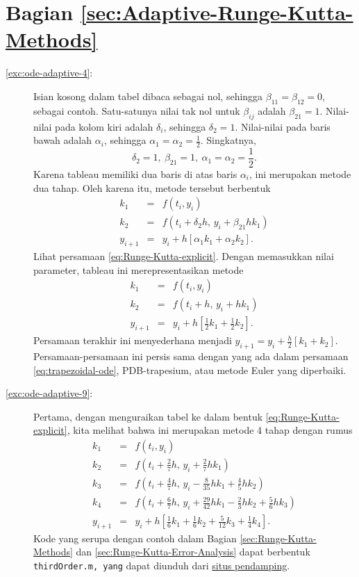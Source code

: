 \section*{Bagian \ref{sec:Adaptive-Runge-Kutta-Methods}}
\begin{description}
\item [{\ref{exc:ode-adaptive-4}:}] Isian kosong dalam tabel dibaca sebagai
nol, sehingga $\beta_{11}=\beta_{12}=0$, sebagai contoh. Satu-satunya
nilai tak nol untuk $\beta_{ij}$ adalah $\beta_{21}=1$. Nilai-nilai
pada kolom kiri adalah $\delta_{i}$, sehingga $\delta_{2}=1$. Nilai-nilai
pada baris bawah adalah $\alpha_{i}$, sehingga $\alpha_{1}=\alpha_{2}=\frac{1}{2}$.
Singkatnya,
\[
\delta_{2}=1,\ \beta_{21}=1,\ \alpha_{1}=\alpha_{2}=\frac{1}{2}.
\]
Karena tableau memiliki dua baris di atas baris $\alpha_{i}$, ini
merupakan metode dua tahap. Oleh karena itu, metode tersebut berbentuk
\begin{eqnarray*}
k_{1} & = & f(t_{i},y_{i})\\
k_{2} & = & f(t_{i}+\delta_{2}h,\,y_{i}+\beta_{21}hk_{1})\\
y_{i+1} & = & y_{i}+h[\alpha_{1}k_{1}+\alpha_{2}k_{2}].
\end{eqnarray*}
Lihat persamaan \ref{eq:Runge-Kutta-explicit}. Dengan memasukkan
nilai parameter, tableau ini merepresentasikan metode
\begin{eqnarray*}
k_{1} & = & f(t_{i},y_{i})\\
k_{2} & = & f(t_{i}+h,\,y_{i}+hk_{1})\\
y_{i+1} & = & y_{i}+h\left[\frac{1}{2}k_{1}+\frac{1}{2}k_{2}\right].
\end{eqnarray*}
Persamaan terakhir ini menyederhana menjadi $y_{i+1}=y_{i}+\frac{h}{2}[k_{1}+k_{2}]$.
Persamaan-persamaan ini persis sama dengan yang ada dalam persamaan
\ref{eq:trapezoidal-ode}, PDB-trapesium, atau metode Euler yang diperbaiki.
\item [{\ref{exc:ode-adaptive-9}:}] Pertama, dengan menguraikan tabel
ke dalam bentuk \ref{eq:Runge-Kutta-explicit}, kita melihat bahwa
ini merupakan metode 4 tahap dengan rumus
\begin{eqnarray*}
k_{1} & = & f(t_{i},y_{i})\\
k_{2} & = & f\left(t_{i}+\frac{2}{7}h,\,y_{i}+\frac{2}{7}hk_{1}\right)\\
k_{3} & = & f\left(t_{i}+\frac{4}{7}h,\,y_{i}-\frac{8}{35}hk_{1}+\frac{4}{5}hk_{2}\right)\\
k_{4} & = & f\left(t_{i}+\frac{6}{7}h,\,y_{i}+\frac{29}{42}hk_{1}-\frac{2}{3}hk_{2}+\frac{5}{6}hk_{3}\right)\\
y_{i+1} & = & y_{i}+h\left[\frac{1}{6}k_{1}+\frac{1}{6}k_{2}+\frac{5}{12}k_{3}+\frac{1}{4}k_{4}\right].
\end{eqnarray*}
Kode yang serupa dengan contoh dalam Bagian \ref{sec:Runge-Kutta-Methods}
dan \ref{sec:Runge-Kutta-Error-Analysis} dapat berbentuk \texttt{thirdOrder.m,
yang} dapat diunduh dari \href{http://lqbrin.github.io/tea-time-numerical/ancillaries.html}{situs pendamping}.


\end{description}
